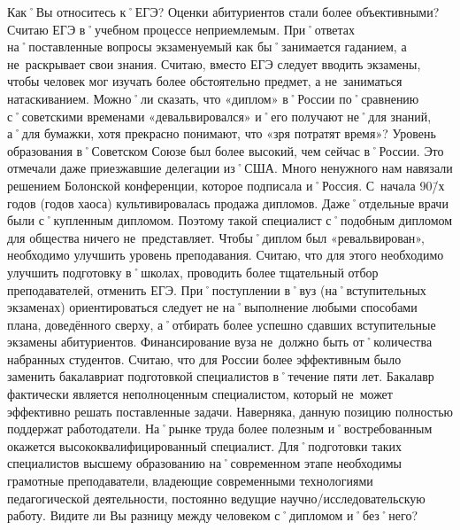 \begin{drama}
	\maxspeaks Как˚Вы относитесь к˚ЕГЭ? Оценки абитуриентов стали более объективными?
	\michaelspeaks Считаю ЕГЭ в˚учебном процессе неприемлемым. При˚ответах на˚поставленные вопросы экзаменуемый как бы˚занимается гаданием, а не~раскрывает свои знания. Считаю, вместо ЕГЭ следует вводить экзамены, чтобы человек мог изучать более обстоятельно предмет, а не~заниматься натаскиванием.
	\maxspeaks Можно˚ли сказать, что  «диплом» в˚России по˚сравнению с˚советскими временами «девальвировался» и˚его получают не˚для знаний, а˚для бумажки, хотя прекрасно понимают, что  «зря потратят время»?
	\michaelspeaks Уровень образования в˚Советском Союзе был более высокий, чем сейчас в˚России. Это отмечали даже приезжавшие делегации из˚США. Много ненужного нам навязали решением Болонской конференции, которое подписала и˚Россия. С~начала 90\=/х годов (годов хаоса) культивировалась продажа дипломов. Даже˚отдельные врачи были с˚купленным дипломом. Поэтому такой специалист с˚подобным дипломом для общества ничего не~представляет. Чтобы˚диплом был «ревальвирован», необходимо улучшить уровень преподавания. Считаю, что для этого необходимо улучшить подготовку в˚школах, проводить более тщательный отбор преподавателей, отменить ЕГЭ. При˚поступлении в˚вуз (на˚вступительных экзаменах) ориентироваться следует не на˚выполнение любыми способами плана, доведённого сверху, а˚отбирать более успешно сдавших вступительные экзамены абитуриентов. Финансирование вуза не~должно быть от˚количества набранных студентов. Считаю, что для России более эффективным было заменить бакалавриат подготовкой специалистов в˚течение пяти лет. Бакалавр фактически является неполноценным специалистом, который не~может эффективно решать поставленные задачи. Наверняка, данную позицию полностью поддержат работодатели. На˚рынке труда более полезным и˚востребованным окажется высококвалифицированный специалист. Для˚подготовки таких специалистов высшему образованию на˚современном этапе необходимы грамотные преподаватели, владеющие современными технологиями педагогической деятельности, постоянно ведущие научно\-/исследовательскую работу.	
	\maxspeaks Видите ли Вы разницу между человеком с˚дипломом и˚без˚него?
	
	\pagebreak
	

\end{drama}
